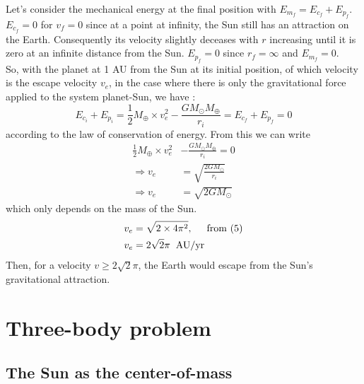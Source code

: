 \documentclass[a4paper, twoside, 11pt]{report}
\theoremstyle{theorem}
\theoremstyle{remark}
\theoremstyle{exemple}
\begin{document}
            \paragraph{}Let's consider the mechanical energy at the final position with $E_{m_f}=E_{c_f} + E_{p_f}$. $E_{c_f} = 0$ for ${v}_{f}=0$ since at a point at infinity, the Sun still has an attraction on the Earth. Consequently its velocity slightly deceases with $r$ increasing until it is zero at an infinite distance from the Sun. $E_{p_f}=0$ since $r_f=\infty$ and $E_{m_f}=0$. \\
            So, with the planet at 1 AU from the Sun at its initial position, of which velocity is the escape velocity $v_e$, in the case where there is only the gravitational force applied to the system planet-Sun, we have :
                \begin{equation*}
                    E_{c_i} + E_{p_i} = \frac{1}{2}M_{\oplus} \times v_e^2 - \frac{GM_{\odot}M_{\oplus}}{r_i} = E_{c_f} + E_{p_f} = 0
                \end{equation*}
            according to the law of conservation of energy. From this we can write
                \begin{align*}
                    \frac{1}{2}M_{\oplus} \times v_e^2 &- \frac{GM_{\odot}M_{\oplus}}{r_i} = 0 \\
                    \Rightarrow v_e &= \sqrt{\frac{2GM_{\odot}}{r_i}} \\
                    \Rightarrow v_e &=\sqrt{2GM_{\odot}}
                \end{align*}
            which only depends on the mass of the Sun. 
                \begin{align*}
                    v_e &= \sqrt{2\times 4\pi^2}, \hspace{0.5cm} \mathrm{from\ (5)}\\
                    v_e &= 2\sqrt{2}\pi \hspace{0.2cm} \mathrm{AU/yr}
                \end{align*}
            Then, for a velocity $v \geq 2\sqrt{2}\pi$, the Earth would escape from the Sun's gravitational attraction. 
                        
                        
    
    \section{Three-body problem}
        \subsection{The Sun as the center-of-mass}   
        
\end{document}
